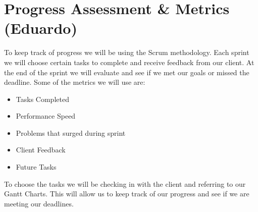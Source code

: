  \section{Progress Assessment \& Metrics (Eduardo)}
To keep track of progress we will be using the Scrum methodology. Each sprint we will choose certain tasks to complete and receive feedback from our client. At the end of the sprint we will evaluate and see if we met our goals or missed the deadline. Some of the metrics we will use are:
\begin{itemize}
    \item Tasks Completed
    \item Performance Speed
    \item Problems that surged during sprint
    \item Client Feedback
    \item Future Tasks
\end{itemize}
To choose the tasks we will be checking in with the client and referring to our Gantt Charts. This will allow us to keep track of our progress and see if we are meeting our deadlines.